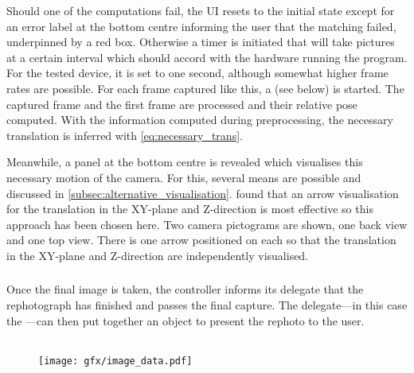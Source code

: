 Should one of the computations fail, the UI resets to the initial state except
for an error label at the bottom centre informing the user that the matching
failed, underpinned by a red box. Otherwise a timer is initiated that will take pictures at a certain
interval which should accord with the hardware running the program. For the
tested device, it is set to one second, although somewhat higher frame rates are
possible. For each frame captured like this, a
 (see below) is started. The captured
frame and the first frame are processed and their relative pose computed. With
the information computed during preprocessing, the necessary translation is
inferred with \eqref{eq:necessary_trans}.

Meanwhile, a panel at the bottom centre is revealed which visualises this
necessary motion of the camera. For this, several means are possible and
discussed in \autoref{subsec:alternative_visualisation}.
\citet{bae2010} found that an arrow visualisation for the translation in the
XY-plane and Z-direction is most effective so this approach has been chosen
here. Two camera pictograms are shown, one back view and one top view. There is
one arrow positioned on each so that the translation in the XY-plane and
Z-direction are independently visualised.


\subsubsection*{}

Once the final image is taken, the controller informs its delegate that the
rephotograph has finished and passes the final capture. The delegate---in this
case the ---can then put together an
 object to present the rephoto to the user.

\subsection{}

\setlength\intextsep{0pt}
\begin{figure}
   \texttt{[image: gfx/image\_data.pdf]}
\end{figure}


